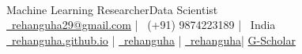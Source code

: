 \begin{center}
	 \\
	\vspace{1mm}

	Machine Learning Researcher{\enskip\cdotp\enskip}Data Scientist\\
	\vspace{2mm}
	\href{mailto:rehanguha29@gmail.com}{\faEnvelope\ rehanguha29@gmail.com} | {\faMobile\ (+91) 9874223189} | {\faMapMarker\ India} \\ 
	{\href{https://rehanguha.github.io/}{\faLink\ rehanguha.github.io}} | {\href{https://www.linkedin.com/in/rehanguha/}{\faLinkedin\ rehanguha}} | \href{https://github.com/rehanguha}{\faGithub\ rehanguha}| \href{https://scholar.google.com/citations?user=zx8JVM8AAAAJ}{\faGraduationCap G-Scholar}
\end{center}